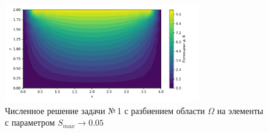 \documentclass[12pt, a4paper]{article}
\begin{document}
			\begin{figure}[!h]
				\centering
				\includegraphics[width=0.75\textwidth]{rect_dirichlet_only_005_calfem.png}
				\caption{Численное решение задачи №\,1 с разбиением области $\Omega$ на элементы с параметром $S_{max} \rightarrow 0.05$}
				\label{fig:dom_rect_005}
			\end{figure}
			
					
					
					
					
					
					
\end{document}
